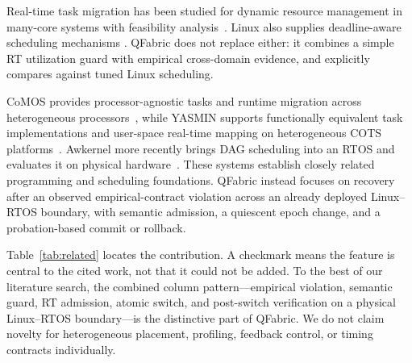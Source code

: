 \documentclass[conference]{IEEEtran}
\newcommand{\system}{QFabric\xspace}
\begin{document}
Real-time task migration has been studied for dynamic resource management in
many-core systems with feasibility analysis~\cite{pourmohseni2020migration}.
Linux also supplies deadline-aware scheduling mechanisms
\cite{lelli2016deadline}. \system does not replace either: it combines a simple
RT utilization guard with empirical cross-domain evidence, and explicitly
compares against tuned Linux scheduling.

CoMOS provides processor-agnostic tasks and runtime migration across
heterogeneous processors~\cite{goraczko2006comos}, while YASMIN supports
functionally equivalent task implementations and user-space real-time mapping
on heterogeneous COTS platforms~\cite{rouxel2021yasmin}. Awkernel more recently
brings DAG scheduling into an RTOS and evaluates it on physical
hardware~\cite{yano2026awkernel}. These systems establish closely related
programming and scheduling foundations. \system instead focuses on recovery
after an observed empirical-contract violation across an already deployed
Linux--RTOS boundary, with semantic admission, a quiescent epoch change, and a
probation-based commit or rollback.

Table~\ref{tab:related} locates the contribution. A checkmark means the feature
is central to the cited work, not that it could not be added. To the best of
our literature search, the combined column pattern---empirical violation,
semantic guard, RT admission, atomic switch, and post-switch verification on a
physical Linux--RTOS boundary---is the distinctive part of \system. We do not
claim novelty for heterogeneous placement, profiling, feedback control, or
timing contracts individually.
\end{document}
